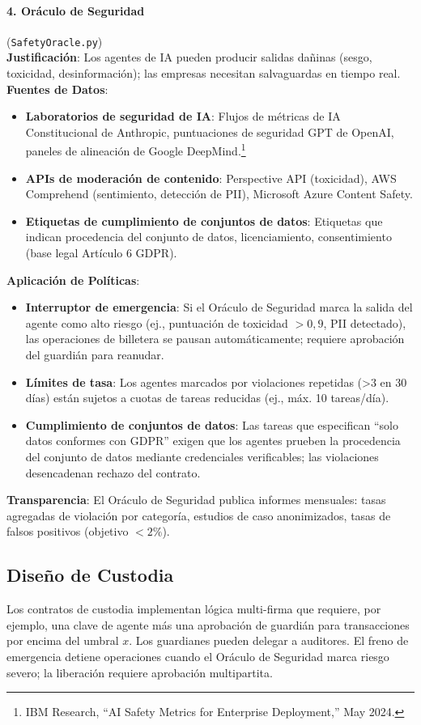 \documentclass[11pt]{article}
\begin{document}
\paragraph{4. Oráculo de Seguridad} (\texttt{SafetyOracle.py})\\
\textbf{Justificación}: Los agentes de IA pueden producir salidas dañinas (sesgo, toxicidad, desinformación); las empresas necesitan salvaguardas en tiempo real.\\
\textbf{Fuentes de Datos}:
\begin{itemize}[noitemsep]
  \item \textbf{Laboratorios de seguridad de IA}: Flujos de métricas de IA Constitucional de Anthropic, puntuaciones de seguridad GPT de OpenAI, paneles de alineación de Google DeepMind.\footnote{IBM Research, ``AI Safety Metrics for Enterprise Deployment,'' May 2024.}
  \item \textbf{APIs de moderación de contenido}: Perspective API (toxicidad), AWS Comprehend (sentimiento, detección de PII), Microsoft Azure Content Safety.
  \item \textbf{Etiquetas de cumplimiento de conjuntos de datos}: Etiquetas que indican procedencia del conjunto de datos, licenciamiento, consentimiento (base legal Artículo 6 GDPR).
\end{itemize}
\textbf{Aplicación de Políticas}:
\begin{itemize}[noitemsep]
  \item \textbf{Interruptor de emergencia}: Si el Oráculo de Seguridad marca la salida del agente como alto riesgo (ej., puntuación de toxicidad $>0,9$, PII detectado), las operaciones de billetera se pausan automáticamente; requiere aprobación del guardián para reanudar.
  \item \textbf{Límites de tasa}: Los agentes marcados por violaciones repetidas (>3 en 30 días) están sujetos a cuotas de tareas reducidas (ej., máx. 10 tareas/día).
  \item \textbf{Cumplimiento de conjuntos de datos}: Las tareas que especifican ``solo datos conformes con GDPR'' exigen que los agentes prueben la procedencia del conjunto de datos mediante credenciales verificables; las violaciones desencadenan rechazo del contrato.
\end{itemize}
\textbf{Transparencia}: El Oráculo de Seguridad publica informes mensuales: tasas agregadas de violación por categoría, estudios de caso anonimizados, tasas de falsos positivos (objetivo $<2\%$).

\subsection{Diseño de Custodia}
Los contratos de custodia implementan lógica multi-firma que requiere, por ejemplo, una clave de agente más una aprobación de guardián para transacciones por encima del umbral $x$. Los guardianes pueden delegar a auditores. El freno de emergencia detiene operaciones cuando el Oráculo de Seguridad marca riesgo severo; la liberación requiere aprobación multipartita.
\end{document}
